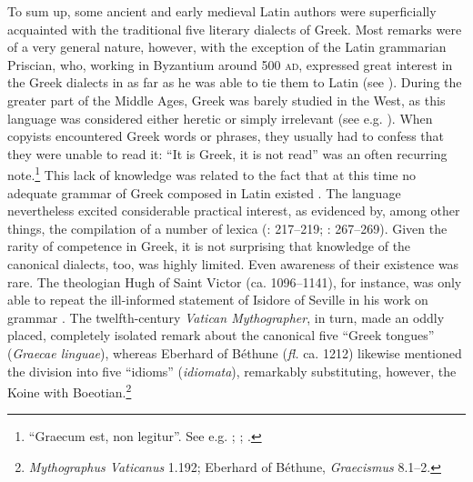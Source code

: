 To sum up, some ancient and early medieval Latin authors were superficially acquainted with the traditional five literary dialects of Greek. Most remarks were of a very general nature, however, with the exception of the Latin grammarian Priscian, who, working in Byzantium around 500 \textsc{ad}, expressed great interest in the Greek dialects in as far as he was able to tie them to Latin (see \citealt{Conduche_latin_nodate}). During the greater part of the Middle Ages, Greek was barely studied in the West, as this language was considered either heretic or simply irrelevant (see e.g. \citealt{Boulhol2014}). When copyists encountered Greek words or phrases, they usually had to confess that they were unable to read it: “It is Greek, it is not read” was an often recurring note.\footnote{ “Graecum est, non legitur”. See e.g. \citet[\textsc{i.}246–275]{Bischoff1961, Bischoff1981}; {\citet[esp. 3ff]{Weiss1977}; \citet[36]{Saladin2000}.}} This lack of knowledge was related to the fact that at this time no adequate grammar of Greek composed in Latin existed \citep[215]{Bischoff1961}. The language nevertheless excited considerable practical interest, as evidenced by, among other things, the compilation of a number of lexica (\citealt{Bischoff1961}: 217–219; \citealt{Dahan1995}: 267–269). Given the rarity of competence in Greek, it is not surprising that knowledge of the canonical dialects, too, was highly limited. Even awareness of their existence was rare. The theologian Hugh of Saint Victor (ca. 1096–1141), for instance, was only able to repeat the ill-informed statement of Isidore of Seville in his work on grammar \citep[79]{Hugh1966}. The twelfth-century \textit{Vatican Mythographer}, in turn, made an oddly placed, completely isolated remark about the canonical five “Greek tongues” (\textit{Graecae linguae}), whereas Eberhard of Béthune (\textit{fl.} ca. 1212) likewise mentioned the division into five “idioms” (\textit{idiomata}), remarkably substituting, however, the Koine with Boeotian.\footnote{\textit{Mythographus Vaticanus} 1.192; Eberhard of Béthune, \textit{Graecismus} 8.1–2.}

